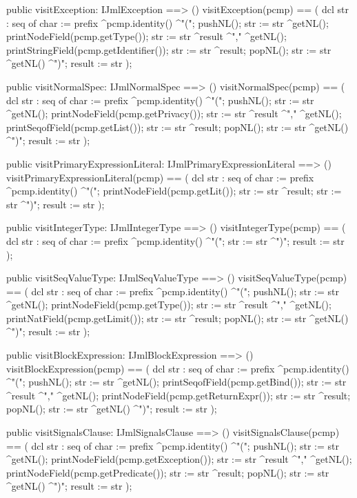 \begin{vdm_al}
  public visitException: IJmlException ==> ()
  visitException(pcmp) ==
    ( dcl str : seq of char := prefix ^pcmp.identity() ^"(";
      pushNL();
      str := str ^getNL();
      printNodeField(pcmp.getType());
      str := str ^result ^"," ^getNL();
      printStringField(pcmp.getIdentifier());
      str := str ^result;
      popNL();
      str := str ^getNL() ^")";
      result := str );

  public visitNormalSpec: IJmlNormalSpec ==> ()
  visitNormalSpec(pcmp) ==
    ( dcl str : seq of char := prefix ^pcmp.identity() ^"(";
      pushNL();
      str := str ^getNL();
      printNodeField(pcmp.getPrivacy());
      str := str ^result ^"," ^getNL();
      printSeqofField(pcmp.getList());
      str := str ^result;
      popNL();
      str := str ^getNL() ^")";
      result := str );

  public visitPrimaryExpressionLiteral: IJmlPrimaryExpressionLiteral ==> ()
  visitPrimaryExpressionLiteral(pcmp) ==
    ( dcl str : seq of char := prefix ^pcmp.identity() ^"(";
      printNodeField(pcmp.getLit());
      str := str ^result;
      str := str ^")";
      result := str );

  public visitIntegerType: IJmlIntegerType ==> ()
  visitIntegerType(pcmp) ==
    ( dcl str : seq of char := prefix ^pcmp.identity() ^"(";
      str := str ^")";
      result := str );

  public visitSeqValueType: IJmlSeqValueType ==> ()
  visitSeqValueType(pcmp) ==
    ( dcl str : seq of char := prefix ^pcmp.identity() ^"(";
      pushNL();
      str := str ^getNL();
      printNodeField(pcmp.getType());
      str := str ^result ^"," ^getNL();
      printNatField(pcmp.getLimit());
      str := str ^result;
      popNL();
      str := str ^getNL() ^")";
      result := str );

  public visitBlockExpression: IJmlBlockExpression ==> ()
  visitBlockExpression(pcmp) ==
    ( dcl str : seq of char := prefix ^pcmp.identity() ^"(";
      pushNL();
      str := str ^getNL();
      printSeqofField(pcmp.getBind());
      str := str ^result ^"," ^getNL();
      printNodeField(pcmp.getReturnExpr());
      str := str ^result;
      popNL();
      str := str ^getNL() ^")";
      result := str );

  public visitSignalsClause: IJmlSignalsClause ==> ()
  visitSignalsClause(pcmp) ==
    ( dcl str : seq of char := prefix ^pcmp.identity() ^"(";
      pushNL();
      str := str ^getNL();
      printNodeField(pcmp.getException());
      str := str ^result ^"," ^getNL();
      printNodeField(pcmp.getPredicate());
      str := str ^result;
      popNL();
      str := str ^getNL() ^")";
      result := str );


\end{vdm_al}
